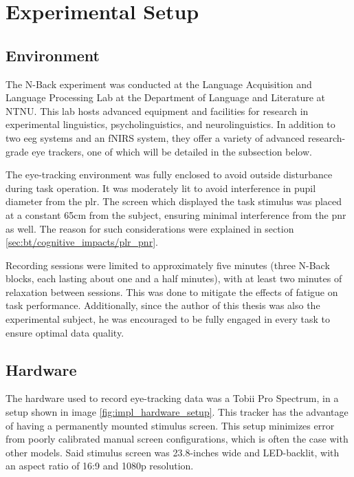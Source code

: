 \section{Experimental Setup}

\subsection{Environment}

The N-Back experiment was conducted at the Language Acquisition and Language Processing Lab at the Department of Language and Literature at NTNU. This lab hosts advanced equipment and facilities for research in experimental linguistics, psycholinguistics, and neurolinguistics. In addition to two \acrshort{eeg} systems and an fNIRS system, they offer a variety of advanced research-grade eye trackers, one of which will be detailed in the subsection below. 

The eye-tracking environment was fully enclosed to avoid outside disturbance during task operation. It was moderately lit to avoid interference in pupil diameter from the \acrshort{plr}. The screen which displayed the task stimulus was placed at a constant 65cm from the subject, ensuring minimal interference from the \acrshort{pnr} as well. The reason for such considerations were explained in section \ref{sec:bt/cognitive_impacts/plr_pnr}. 

Recording sessions were limited to approximately five minutes (three N-Back blocks, each lasting about one and a half minutes), with at least two minutes of relaxation between sessions. This was done to mitigate the effects of fatigue on task performance. Additionally, since the author of this thesis was also the experimental subject, he was encouraged to be fully engaged in every task to ensure optimal data quality.

\subsection{Hardware}

The hardware used to record eye-tracking data was a Tobii Pro Spectrum, in a setup shown in image \ref{fig:impl_hardware_setup}. This tracker has the advantage of having a permanently mounted stimulus screen. This setup minimizes error from poorly calibrated manual screen configurations, which is often the case with other models. Said stimulus screen was 23.8-inches wide and LED-backlit, with an aspect ratio of 16:9 and 1080p resolution.

